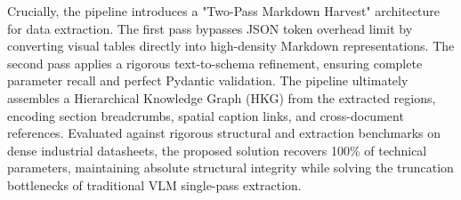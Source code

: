 Crucially, the pipeline introduces a "Two-Pass Markdown Harvest" architecture for data extraction. The first pass bypasses JSON token overhead limit by converting visual tables directly into high-density Markdown representations. The second pass applies a rigorous text-to-schema refinement, ensuring complete parameter recall and perfect Pydantic validation. The pipeline ultimately assembles a Hierarchical Knowledge Graph (HKG) from the extracted regions, encoding section breadcrumbs, spatial caption links, and cross-document references. Evaluated against rigorous structural and extraction benchmarks on dense industrial datasheets, the proposed solution recovers 100\% of technical parameters, maintaining absolute structural integrity while solving the truncation bottlenecks of traditional VLM single-pass extraction.


\cleardoublepage

